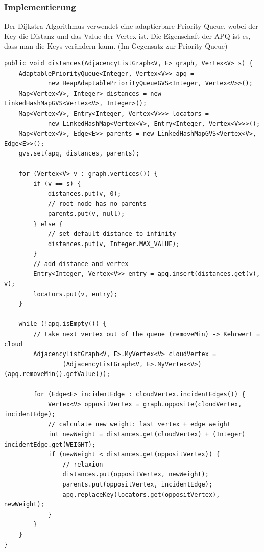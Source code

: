 \clearpage
\subsubsection{Implementierung}
Der Dijkstra Algorithmus verwendet eine adaptierbare Priority Queue, wobei der Key die Distanz und das Value der Vertex ist. Die Eigenschaft der APQ ist es, dass man die Keys verändern kann. (Im Gegensatz zur Priority Queue)

\begin{lstlisting}[caption=Dijkstra Algorithmus]
public void distances(AdjacencyListGraph<V, E> graph, Vertex<V> s) {
	AdaptablePriorityQueue<Integer, Vertex<V>> apq = 
			new HeapAdaptablePriorityQueueGVS<Integer, Vertex<V>>();
	Map<Vertex<V>, Integer> distances = new LinkedHashMapGVS<Vertex<V>, Integer>();
	Map<Vertex<V>, Entry<Integer, Vertex<V>>> locators =
			new LinkedHashMap<Vertex<V>, Entry<Integer, Vertex<V>>>();
	Map<Vertex<V>, Edge<E>> parents = new LinkedHashMapGVS<Vertex<V>, Edge<E>>();
	gvs.set(apq, distances, parents);
	
	for (Vertex<V> v : graph.vertices()) {
		if (v == s) {
			distances.put(v, 0);
			// root node has no parents
			parents.put(v, null);
		} else {
			// set default distance to infinity
			distances.put(v, Integer.MAX_VALUE);
		}
		// add distance and vertex
		Entry<Integer, Vertex<V>> entry = apq.insert(distances.get(v), v);
		locators.put(v, entry);
	}

	while (!apq.isEmpty()) {
		// take next vertex out of the queue (removeMin) -> Kehrwert =  cloud
		AdjacencyListGraph<V, E>.MyVertex<V> cloudVertex = 
				(AdjacencyListGraph<V, E>.MyVertex<V>) (apq.removeMin().getValue());
				
		for (Edge<E> incidentEdge : cloudVertex.incidentEdges()) {
			Vertex<V> oppositVertex = graph.opposite(cloudVertex, incidentEdge);
			// calculate new weight: last vertex + edge weight
			int newWeight = distances.get(cloudVertex) + (Integer) incidentEdge.get(WEIGHT);
			if (newWeight < distances.get(oppositVertex)) {
				// relaxion
				distances.put(oppositVertex, newWeight);
				parents.put(oppositVertex, incidentEdge);
				apq.replaceKey(locators.get(oppositVertex), newWeight);
			}
		}
	}
}
\end{lstlisting}

\clearpage
